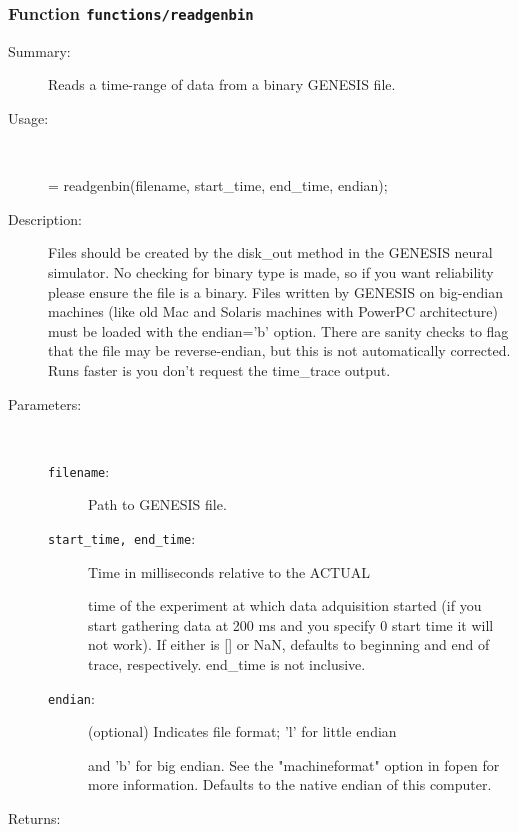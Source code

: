 \subsubsection[Function \texttt{readgenbin}]{Function \texttt{functions/readgenbin}}%
%
\label{ref_functions__readgenbin}%
\hypertarget{ref_functions__readgenbin}{}%
\begin{description}
\item[Summary:]Reads a time-range of data from a binary GENESIS file.
%
\item[Usage:]~%
\begin{lyxcode}%
[data, time\_trace] = readgenbin(filename, start\_time, end\_time, endian);
%
\end{lyxcode}%
%
\item[Description:]%
Files should be created by the disk\_out method in the GENESIS neural
 simulator. No checking for binary type is made, so if you want reliability please
 ensure the file is a binary. Files written by GENESIS on big-endian
 machines (like old Mac and Solaris machines with PowerPC architecture)
 must be loaded with the endian='b' option. There are sanity checks to
 flag that the file may be reverse-endian, but this is not automatically
 corrected. Runs faster is you don't request the time\_trace output.
\item[Parameters:]~
\begin{description}%
\item[\texttt{filename}:]
 Path to GENESIS file.
\item[\texttt{start\_time, end\_time}:]
 Time in milliseconds relative to the ACTUAL 

time of the experiment at which data adquisition started 
(if you start gathering data at 200 ms and you specify 0
start time it will not work). If either is [] or NaN, defaults
to beginning and end of trace, respectively. end\_time is 
not inclusive.
\item[\texttt{endian}:]
 (optional) Indicates file format; 'l' for little endian

and 'b' for big endian. See the "machineformat" option 
in fopen for more information. Defaults to the native endian
of this computer.
\end{description}%
%
\item[Returns:
]~


\end{description}
